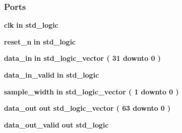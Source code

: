 \subsubsection*{Ports}
 \begin{DoxyCompactItemize}
\item 
{\bf clk}  {\bfseries {\bfseries \textcolor{keywordflow}{in}\textcolor{vhdlchar}{ }}} {\bfseries \textcolor{comment}{std\+\_\+logic}\textcolor{vhdlchar}{ }} 
\item 
{\bf reset\+\_\+n}  {\bfseries {\bfseries \textcolor{keywordflow}{in}\textcolor{vhdlchar}{ }}} {\bfseries \textcolor{comment}{std\+\_\+logic}\textcolor{vhdlchar}{ }} 
\item 
{\bf data\+\_\+in}  {\bfseries {\bfseries \textcolor{keywordflow}{in}\textcolor{vhdlchar}{ }}} {\bfseries \textcolor{comment}{std\+\_\+logic\+\_\+vector}\textcolor{vhdlchar}{ }\textcolor{vhdlchar}{(}\textcolor{vhdlchar}{ }\textcolor{vhdlchar}{ } \textcolor{vhdldigit}{31} \textcolor{vhdlchar}{ }\textcolor{keywordflow}{downto}\textcolor{vhdlchar}{ }\textcolor{vhdlchar}{ } \textcolor{vhdldigit}{0} \textcolor{vhdlchar}{ }\textcolor{vhdlchar}{)}\textcolor{vhdlchar}{ }} 
\item 
{\bf data\+\_\+in\+\_\+valid}  {\bfseries {\bfseries \textcolor{keywordflow}{in}\textcolor{vhdlchar}{ }}} {\bfseries \textcolor{comment}{std\+\_\+logic}\textcolor{vhdlchar}{ }} 
\item 
{\bf sample\+\_\+width}  {\bfseries {\bfseries \textcolor{keywordflow}{in}\textcolor{vhdlchar}{ }}} {\bfseries \textcolor{comment}{std\+\_\+logic\+\_\+vector}\textcolor{vhdlchar}{ }\textcolor{vhdlchar}{(}\textcolor{vhdlchar}{ }\textcolor{vhdlchar}{ } \textcolor{vhdldigit}{1} \textcolor{vhdlchar}{ }\textcolor{keywordflow}{downto}\textcolor{vhdlchar}{ }\textcolor{vhdlchar}{ } \textcolor{vhdldigit}{0} \textcolor{vhdlchar}{ }\textcolor{vhdlchar}{)}\textcolor{vhdlchar}{ }} 
\item 
{\bf data\+\_\+out}  {\bfseries {\bfseries \textcolor{keywordflow}{out}\textcolor{vhdlchar}{ }}} {\bfseries \textcolor{comment}{std\+\_\+logic\+\_\+vector}\textcolor{vhdlchar}{ }\textcolor{vhdlchar}{(}\textcolor{vhdlchar}{ }\textcolor{vhdlchar}{ } \textcolor{vhdldigit}{63} \textcolor{vhdlchar}{ }\textcolor{keywordflow}{downto}\textcolor{vhdlchar}{ }\textcolor{vhdlchar}{ } \textcolor{vhdldigit}{0} \textcolor{vhdlchar}{ }\textcolor{vhdlchar}{)}\textcolor{vhdlchar}{ }} 
\item 
{\bf data\+\_\+out\+\_\+valid}  {\bfseries {\bfseries \textcolor{keywordflow}{out}\textcolor{vhdlchar}{ }}} {\bfseries \textcolor{comment}{std\+\_\+logic}\textcolor{vhdlchar}{ }} 
\end{DoxyCompactItemize}


